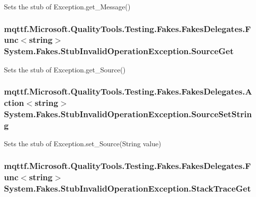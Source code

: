 Sets the stub of Exception.\-get\-\_\-\-Message()

\hypertarget{class_system_1_1_fakes_1_1_stub_invalid_operation_exception_a3e5647b3867b9e70bdaa9a0b14960dd1}{
\subsubsection[{Source\-Get}]{\setlength{\rightskip}{0pt plus 5cm}mqttf.\-Microsoft.\-Quality\-Tools.\-Testing.\-Fakes.\-Fakes\-Delegates.\-Func$<$string$>$ System.\-Fakes.\-Stub\-Invalid\-Operation\-Exception.\-Source\-Get}}\label{class_system_1_1_fakes_1_1_stub_invalid_operation_exception_a3e5647b3867b9e70bdaa9a0b14960dd1}


Sets the stub of Exception.\-get\-\_\-\-Source()

\hypertarget{class_system_1_1_fakes_1_1_stub_invalid_operation_exception_a2c361bf5cc755aff129c37415b1bce1c}{
\subsubsection[{Source\-Set\-String}]{\setlength{\rightskip}{0pt plus 5cm}mqttf.\-Microsoft.\-Quality\-Tools.\-Testing.\-Fakes.\-Fakes\-Delegates.\-Action$<$string$>$ System.\-Fakes.\-Stub\-Invalid\-Operation\-Exception.\-Source\-Set\-String}}\label{class_system_1_1_fakes_1_1_stub_invalid_operation_exception_a2c361bf5cc755aff129c37415b1bce1c}


Sets the stub of Exception.\-set\-\_\-\-Source(\-String value)

\hypertarget{class_system_1_1_fakes_1_1_stub_invalid_operation_exception_ac420b845b22012d3ca344fc5ad14c8d3}{
\subsubsection[{Stack\-Trace\-Get}]{\setlength{\rightskip}{0pt plus 5cm}mqttf.\-Microsoft.\-Quality\-Tools.\-Testing.\-Fakes.\-Fakes\-Delegates.\-Func$<$string$>$ System.\-Fakes.\-Stub\-Invalid\-Operation\-Exception.\-Stack\-Trace\-Get}}\label{class_system_1_1_fakes_1_1_stub_invalid_operation_exception_ac420b845b22012d3ca344fc5ad14c8d3}


